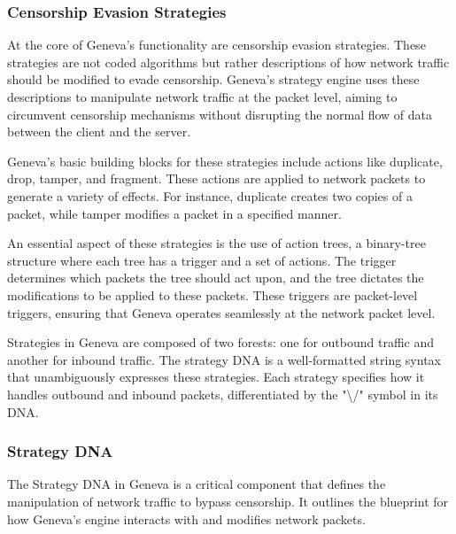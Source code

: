 \documentclass[12pt, fleqn, a4paper]{article}
\begin{document}
\subsubsection{Censorship Evasion Strategies}
At the core of Geneva's functionality are censorship evasion strategies. These strategies are not coded algorithms but rather descriptions of how network traffic should be modified to evade censorship. Geneva's strategy engine uses these descriptions to manipulate network traffic at the packet level, aiming to circumvent censorship mechanisms without disrupting the normal flow of data between the client and the server.

Geneva's basic building blocks for these strategies include actions like duplicate, drop, tamper, and fragment. These actions are applied to network packets to generate a variety of effects. For instance, duplicate creates two copies of a packet, while tamper modifies a packet in a specified manner.

An essential aspect of these strategies is the use of action trees, a binary-tree structure where each tree has a trigger and a set of actions. The trigger determines which packets the tree should act upon, and the tree dictates the modifications to be applied to these packets. These triggers are packet-level triggers, ensuring that Geneva operates seamlessly at the network packet level.

Strategies in Geneva are composed of two forests: one for outbound traffic and another for inbound traffic. The strategy DNA is a well-formatted string syntax that unambiguously expresses these strategies. Each strategy specifies how it handles outbound and inbound packets, differentiated by the "\textbackslash /" symbol in its DNA.

\subsubsection{Strategy DNA}
The Strategy DNA in Geneva is a critical component that defines the manipulation of network traffic to bypass censorship. It outlines the blueprint for how Geneva's engine interacts with and modifies network packets.
\end{document}
